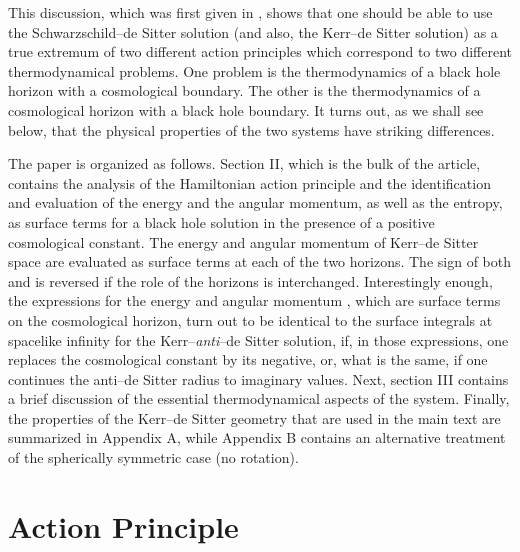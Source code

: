 \documentclass[a4paper,preprintnumbers,amsmath,amssymb]{revtex4}
\begin{document}
This discussion, which was first given in \cite{CT},
 shows that one should be able to use the Schwarzschild--de Sitter solution
(and also, the Kerr--de Sitter solution)  as a true extremum of two different action
principles which correspond to two different thermodynamical problems. One problem is the
thermodynamics of a black hole horizon with a cosmological boundary. The
other is the thermodynamics of a cosmological horizon with a black hole
boundary. It turns out, as we shall see below, that the physical
properties of the two systems have striking differences.

 The paper is organized as follows. Section II, which is the bulk of the article, contains the analysis of the
Hamiltonian action principle and the identification and evaluation of the energy and the
angular momentum, as well as the entropy, as surface terms for a black hole solution in the presence of a positive
cosmological constant.  The energy \coordHE{} and angular momentum \coordHE{} of Kerr--de Sitter space
are evaluated as surface terms at each of the two horizons. The sign of both \coordHE{} and \coordHE{}
is reversed if the role of the horizons is interchanged. Interestingly enough, the expressions
for the energy \coordHE{} and angular momentum \coordHE{}, which are surface terms on the cosmological
horizon, turn out to be identical to the surface integrals at spacelike infinity for the
Kerr--{\it anti}--de Sitter solution, if, in those expressions, one replaces the cosmological
constant by its negative, or, what is the same, if one continues the anti--de Sitter
radius to imaginary values. Next, section III contains a brief discussion of the essential thermodynamical
aspects of the system. Finally, the properties of the Kerr--de Sitter geometry that are used in the main text are
summarized in Appendix A, while Appendix B contains an alternative treatment
of the spherically symmetric case (no rotation).

\section{Action Principle}
\label{one}
\end{document}
